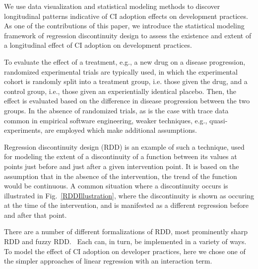 We use data visualization and statistical modeling methods to discover longitudinal patterns indicative of CI adoption effects on development practices.
As one of the contributions of this paper, we introduce the statistical modeling framework of {\emph regression discontinuity design} to assess the existence and extent of a longitudinal effect of CI adoption on development practices.

To evaluate the effect of a treatment, e.g., a new drug on a disease progression, randomized experimental trials are typically used, in which the experimental cohort is randomly split into a treatment group, i.e. those given the drug, and a control group, i.e., those given an experientially identical placebo. Then, the effect is evaluated based on the difference in disease progression between the two groups.
In the absence of randomized trials, as is the case with trace data common in empirical software engineering, weaker techniques, e.g., quasi-experiments, are employed which make additional assumptions.

Regression discontinuity design (RDD) is an example of such a technique, used for modeling the extent of a discontinuity of a function between its values at points just before and just after a given intervention point. 
It is based on the assumption that in the absence of the intervention, the trend of the function would be continuous.
A common situation where a discontinuity occurs is illustrated in Fig.~\ref{RDDIllustration}, where the discontinuity is shown as occuring at the time of the intervention, and is manifested as a different regression before and after that point.

There are a number of different formalizations of RDD, most prominently sharp RDD and fuzzy RDD.~\cite{}
Each can, in turn, be implemented in a variety of ways.
To model the effect of CI adoption on developer practices, here we chose one of the simpler approaches of linear regression with an interaction term.




 




